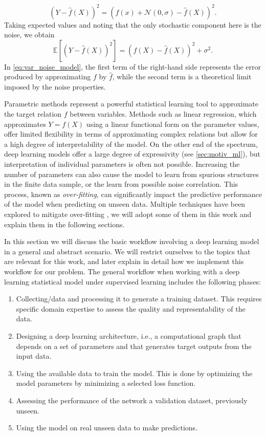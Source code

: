 $$(Y-\hat{f}(X))^2=(f(x)+\mathcal{N}(0,\sigma)-\hat{f}(X))^2.$$
Taking expected values and noting that the only stochastic component here is the noise, we obtain 
\begin{equation}\label{eq:var_noise_model}
    \mathbb{E}[(Y-\hat{f}(X))^2]=(f(X)-\hat{f}(X))^2+\sigma^2.
\end{equation}
In \cref{eq:var_noise_model}, the first term of the right-hand side represents the error produced by approximating $f$ by $\hat{f}$, while the second term is a theoretical limit imposed by the noise properties.

Parametric methods represent a powerful statistical learning tool to approximate the target relation $f$ between variables.
Methods such as linear regression, which approximates $Y=f(X)$ using a linear functional form on the parameter values, offer limited flexibility in terms of approximating complex relations but allow for a high degree of interpretability of the model. On the other end of the spectrum, deep learning models offer a large degree of expressivity (see \ref{sec:motiv_ml}), but interpretation of individual parameters is often not possible. Increasing the number of parameters can also cause the model to learn from spurious structures in the finite data sample, or the learn from possible noise correlation. This process, known as \emph{over-fitting}, can significantly impact the predictive performance of the model when predicting on unseen data. Multiple techniques have been explored to mitigate over-fitting \cite{overfitting}, we will adopt some of them in this work and explain them in the following sections.

In this section we will discuss the basic workflow involving a deep learning model in a general and abstract scenario. We will restrict ourselves to the topics that are relevant for this work, and later explain in detail how we implement this workflow for our problem.
The general workflow when working with a deep learning statistical model under supervised learning includes the following phases:
\begin{enumerate}
    \item Collecting/data and processing it to generate a training dataset. This requires specific domain expertise to assess the quality and representability of the data.
    \item Designing a deep learning architecture, i.e., a computational graph that depends on a set of parameters and that generates target outputs from the input data.
    \item Using the available data to train the model. This is done by optimizing the model parameters by minimizing a selected loss function.
    \item Assessing the performance of the network a validation dataset, previously unseen.
    \item Using the model on real unseen data to make predictions.
\end{enumerate}


